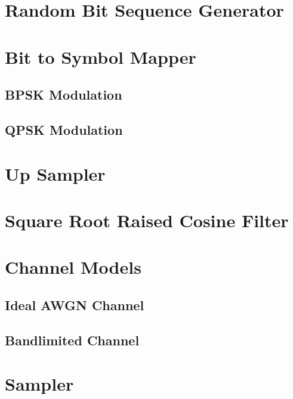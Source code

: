 \documentclass[]{article}
\begin{document}
\section{Random Bit Sequence Generator}
\label{app:random_bit_generator}


\section{Bit to Symbol Mapper}
\label{app:bittosym}
\subsection{BPSK Modulation}
\label{app:bpsk_mod}


\subsection{QPSK Modulation}
\label{app:qpsk_mod}


\section{Up Sampler}
\label{app:impulse_train}


\section{Square Root Raised Cosine Filter}
\label{app:sqrt_raised_cosine}


\section{Channel Models}
\subsection{Ideal AWGN Channel}
\label{app:awgn_channel}


\subsection{Bandlimited Channel}
\label{app:bandlimited}


\section{Sampler}
\label{app:sampler}

\end{document}
